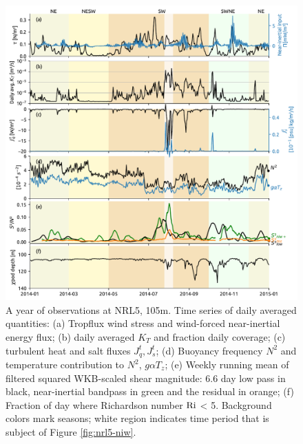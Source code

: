 \documentclass[twocol]{ametsoc}
\begin{document}
\begin{figure}
\centering
\includegraphics[width=\textwidth]{figure6-nrl5.pdf}
\caption{\label{fig:nrl}
A year of observations at NRL5, 105m. Time series of daily averaged quantities: (a) Tropflux wind stress and wind-forced near-inertial energy flux; (b) daily averaged \(K_T\) and fraction daily coverage; (c) turbulent heat and salt fluxes \(J_q^t, J_s^t\); (d) Buoyancy frequency \(N^2\) and temperature contribution to \(N^2\), \(g \alpha T_z\); (e) Weekly running mean of filtered squared WKB-scaled shear magnitude: 6.6 day low pass in black, near-inertial bandpass in green and the residual in orange; (f) Fraction of day where Richardson number \(\textnormal{Ri}\) < 5. Background colors mark seasons; white region indicates time period that is subject of Figure \ref{fig:nrl5-niw}.}
\end{figure}
\end{document}
